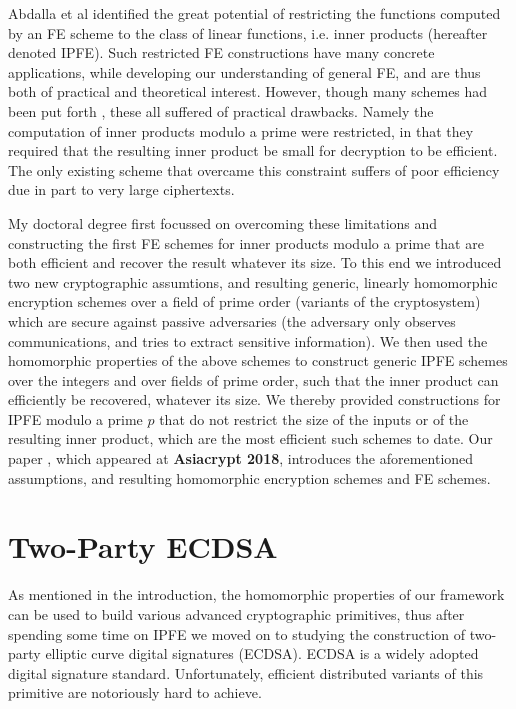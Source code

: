 \documentclass[10pt]{llncs}
\begin{document}
Abdalla et al \cite{PKC:ABDP15} identified the great potential of restricting the functions computed by an FE scheme to the class of linear functions, i.e. inner products (hereafter denoted IPFE). Such restricted FE constructions have many concrete applications, while developing our understanding of general FE, and are thus both of practical and theoretical interest. However, though many schemes had been put forth \cite{PKC:ABDP15,EPRINT:ABDP16,C:AgrLibSte16}, these all suffered of practical drawbacks. Namely the computation of inner products modulo a prime were restricted, in that they required that the resulting inner product be small for decryption to be efficient. The only existing scheme that overcame this constraint \cite{C:AgrLibSte16} suffers of poor efficiency due in part to very large ciphertexts.

My doctoral degree first focussed on overcoming these limitations and constructing the first FE schemes for inner products modulo a prime that are both efficient and recover the result whatever its size.
%
To this end we introduced two new cryptographic assumtions, and resulting generic, linearly homomorphic encryption schemes over a field of prime order  (variants of the \cite{RSA:CasLag15} cryptosystem) which are secure against passive adversaries (the adversary only observes communications, and tries to extract sensitive information).
%
We then used the homomorphic properties of the above schemes to construct generic IPFE schemes over the integers and over fields of prime order, such that the inner product can efficiently be recovered, whatever its size. 
We thereby provided constructions for IPFE modulo a prime $p$ that do not restrict the size of the inputs or of the resulting inner product, which are the most efficient such schemes to date.
%
Our paper \cite{AC:CasLagTuc18}, which appeared at \textbf{Asiacrypt 2018}, introduces the aforementioned assumptions, and resulting homomorphic encryption schemes and FE schemes.

\section{Two-Party ECDSA}
As mentioned in the introduction, the homomorphic properties of our framework can be used to build various advanced cryptographic primitives, thus after spending some time on IPFE we moved on to studying the construction of two-party elliptic curve digital signatures (ECDSA).
%
ECDSA is a widely adopted digital signature standard. Unfortunately, efficient distributed variants of this primitive are notoriously hard to achieve. 
\end{document}
